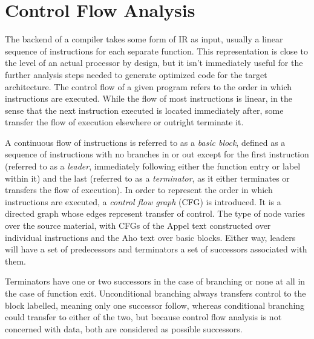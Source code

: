 \documentclass{article}
\begin{document}

\section{Control Flow Analysis}



The backend of a compiler takes some form of IR as input, usually a linear sequence of instructions for each separate function. This representation is close to the level of an actual processor by design, but it isn't immediately useful for the further analysis steps needed to generate optimized code for the target architecture. %
The control flow of a given program refers to the order in which instructions are executed. While the flow of most instructions is linear, in the sense that the next instruction executed is located immediately after, some transfer the flow of execution elsewhere or outright terminate it. %


A continuous flow of instructions is referred to as a \textit{basic block}, defined as a sequence of instructions with no branches in or out except for the first instruction (referred to as a \textit{leader}, immediately following either the function entry or label within it) and the last (referred to as a \textit{terminator}, as it either terminates or transfers the flow of execution). %
In order to represent the order in which instructions are executed, a \textit{control flow graph} (CFG) is introduced. It is a directed graph whose edges represent transfer of control. The type of node varies over the source material, with CFGs of the Appel text \cite{tiger} constructed over individual instructions  and the Aho text \cite{dragon} over basic blocks.
Either way, leaders will have a set of predecessors and terminators a set of successors associated with them.

Terminators have one or two successors in the case of branching or none at all in the case of function exit. %
Unconditional branching always transfers control to the block labelled, meaning only one successor follow, whereas conditional branching could transfer to either of the two, but because control flow analysis is not concerned with data, both are considered as possible successors. %
\end{document}
